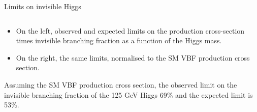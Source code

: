 \documentclass[8pt]{beamer}
\begin{document}
\begin{frame}{Limits on invisible Higgs}
\begin{columns}
\begin{block}
\end{block}

\end{columns}

\begin{itemize}
 \item On the left, observed and expected limits on the production cross-section times invisible branching fraction as a function of the Higgs mass. 
 \item On the right, the same limits, normalised to the SM VBF production cross section.
\end{itemize}

Assuming the SM VBF production cross section, the observed limit on the invisible branching fraction of the 125 GeV Higgs 69\% and the expected limit is 53\%. 

\end{frame}
\end{document}
